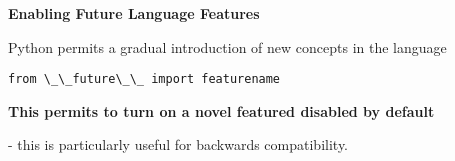 \textbf{Enabling Future Language Features}

Python permits a gradual introduction of new concepts in the language

\begin{lstlisting}
from \_\_future\_\_ import featurename
\end{lstlisting}

\textbf{This permits to turn on a novel featured disabled by default}

- this is particularly useful for backwards compatibility.
